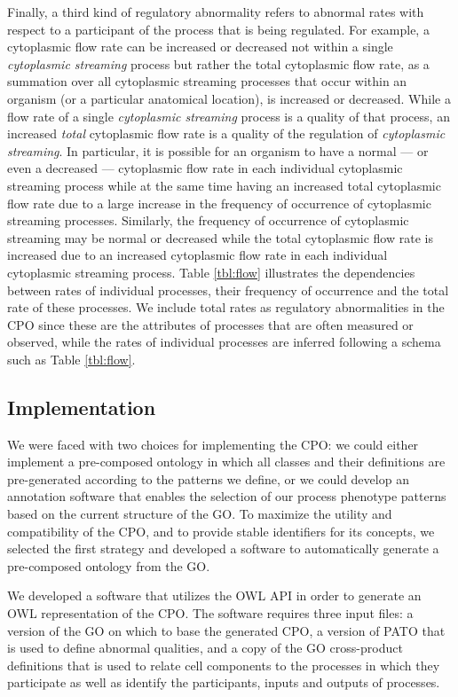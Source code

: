 \documentclass{bioinfo}
\renewcommand{\cite}{\citep}
\begin{document}
Finally, a third kind of regulatory abnormality refers to abnormal
rates with respect to a participant of the process that is being
regulated. For example, a cytoplasmic flow rate can be increased or
decreased not within a single {\em cytoplasmic streaming} process but
rather the total cytoplasmic flow rate, as a summation over all
cytoplasmic streaming processes that occur within an organism (or a
particular anatomical location), is increased or decreased. While a
flow rate of a single {\em cytoplasmic streaming} process is a quality
of that process, an increased {\em total} cytoplasmic flow rate is a
quality of the regulation of {\em cytoplasmic streaming}. In
particular, it is possible for an organism to have a normal --- or
even a decreased --- cytoplasmic flow rate in each individual
cytoplasmic streaming process while at the same time having an
increased total cytoplasmic flow rate due to a large increase in the
frequency of occurrence of cytoplasmic streaming processes. Similarly,
the frequency of occurrence of cytoplasmic streaming may be normal or
decreased while the total cytoplasmic flow rate is increased due to an
increased cytoplasmic flow rate in each individual cytoplasmic
streaming process. Table \ref{tbl:flow} illustrates the dependencies
between rates of individual processes, their frequency of occurrence
and the total rate of these processes. We include total rates as
regulatory abnormalities in the CPO since these are the attributes of
processes that are often measured or observed, while the rates of
individual processes are inferred following a schema such as Table
\ref{tbl:flow}.

\subsection{Implementation}
We were faced with two choices for implementing the CPO: we could
either implement a pre-composed ontology in which all classes and
their definitions are pre-generated according to the patterns we
define, or we could develop an annotation software that enables the
selection of our process phenotype patterns based on the current
structure of the GO.  To maximize the utility and compatibility of the
CPO, and to provide stable identifiers for its concepts, we selected
the first strategy and developed a software to automatically generate
a pre-composed ontology from the GO.

We developed a software that utilizes the OWL API \cite{Horridge2007}
in order to generate an OWL representation of the CPO. The software
requires three input files: a version of the GO on which to base the
generated CPO, a version of PATO that is used to define abnormal
qualities, and a copy of the GO cross-product definitions
\cite{Mungall2010go} that is used to relate cell components to the
processes in which they participate as well as identify the
participants, inputs and outputs of processes.
\end{document}
